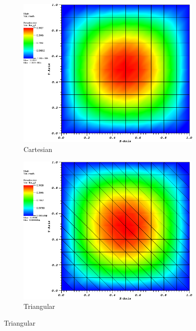 \begin{figure}
\centering
{
	\begin{subfigure}[b]{0.465\textwidth}
		\centering
		\label{subfig::x2y2_cart_me_k2_lin_sol}
		\includegraphics[width=\textwidth]{figures/sec_BF/x2y2Sol_Cart_ME2.png}
		\caption{Cartesian}
	\end{subfigure}
	\hfill
	\begin{subfigure}[b]{0.465\textwidth}
		\centering
		\label{subfig::x2y2_tri_me_k2_lin_sol}
		\includegraphics[width=\textwidth]{figures/sec_BF/x2y2Sol_Tri_ME2.png}
		\caption{Triangular}

\end{subfigure}}
\end{figure}
